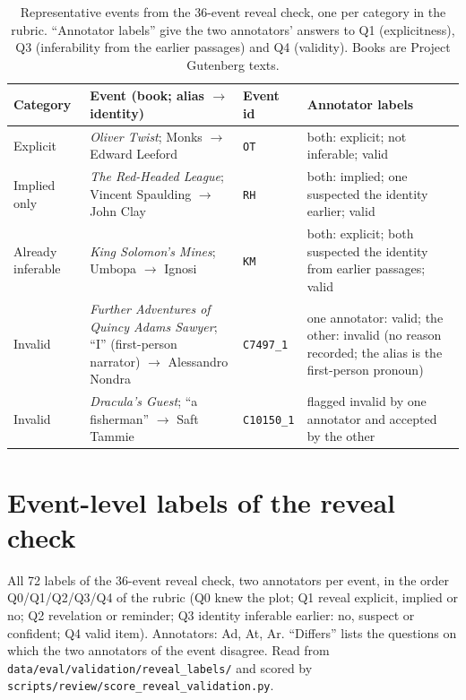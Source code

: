 \documentclass[11pt]{article}
\begin{document}
\begin{table}[!ht]
\caption{Representative events from the 36-event reveal check, one per category in the rubric. ``Annotator labels'' give the two annotators' answers to Q1 (explicitness), Q3 (inferability from the earlier passages) and Q4 (validity). Books are Project Gutenberg texts.}\label{tab:reveal_examples}
\footnotesize
\begin{tabular*}{\textwidth}{@{\extracolsep\fill}p{1.9cm}p{4.0cm}p{2.0cm}p{3.8cm}}
\toprule
Category & Event (book; alias $\to$ identity) & Event id & Annotator labels \\
\midrule
Explicit & \emph{Oliver Twist}; Monks $\to$ Edward Leeford & \texttt{OT} & both: explicit; not inferable; valid \\
Implied only & \emph{The Red-Headed League}; Vincent Spaulding $\to$ John Clay & \texttt{RH} & both: implied; one suspected the identity earlier; valid \\
Already inferable & \emph{King Solomon's Mines}; Umbopa $\to$ Ignosi & \texttt{KM} & both: explicit; both suspected the identity from earlier passages; valid \\
Invalid & \emph{Further Adventures of Quincy Adams Sawyer}; ``I'' (first-person narrator) $\to$ Alessandro Nondra & \texttt{C7497\_1} & one annotator: valid; the other: invalid (no reason recorded; the alias is the first-person pronoun) \\
Invalid & \emph{Dracula's Guest}; ``a fisherman'' $\to$ Saft Tammie & \texttt{C10150\_1} & flagged invalid by one annotator and accepted by the other \\
\bottomrule
\end{tabular*}
\end{table}

\section{Event-level labels of the reveal check}
All 72 labels of the 36-event reveal check, two annotators per event, in the order Q0/Q1/Q2/Q3/Q4 of the rubric (Q0 knew the plot; Q1 reveal explicit, implied or no; Q2 revelation or reminder; Q3 identity inferable earlier: no, suspect or confident; Q4 valid item). Annotators: Ad, At, Ar. ``Differs'' lists the questions on which the two annotators of the event disagree. Read from \nolinkurl{data/eval/validation/reveal_labels/} and scored by \nolinkurl{scripts/review/score_reveal_validation.py}.
\end{document}
